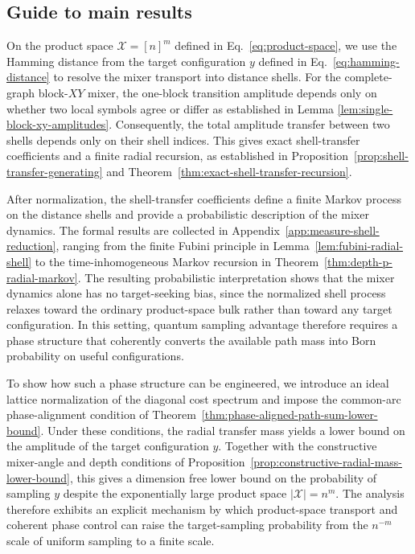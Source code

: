 \documentclass[a4paper,onecolumn,11pt,unpublished]{quantumarticle}
\theoremstyle{remark}
\begin{document}
\subsection{Guide to main results}
On the product space \(\mathcal X=[n]^m\) defined in Eq.~\eqref{eq:product-space}, we use the Hamming distance from the target configuration \(y\) defined in Eq.~\eqref{eq:hamming-distance} to resolve the
mixer transport into distance shells. For the complete-graph block-\(XY\)
mixer, the one-block transition amplitude depends only on whether two local
symbols agree or differ as established in Lemma \ref{lem:single-block-xy-amplitudes}. Consequently, the total amplitude transfer
between two shells depends only on their shell indices. This gives exact
shell-transfer coefficients and a finite radial recursion, as established in
Proposition~\ref{prop:shell-transfer-generating} and
Theorem~\ref{thm:exact-shell-transfer-recursion}.


After normalization, the shell-transfer coefficients define a finite Markov process on the distance shells and provide a probabilistic description of the mixer dynamics. The formal results are collected in Appendix~\ref{app:measure-shell-reduction}, ranging from the finite Fubini principle in Lemma~\ref{lem:fubini-radial-shell} to the time-inhomogeneous Markov recursion in Theorem~\ref{thm:depth-p-radial-markov}. The resulting probabilistic interpretation shows that the mixer dynamics alone has no target-seeking bias, since the normalized shell process relaxes toward the ordinary product-space bulk rather than toward any target configuration. In this setting, quantum sampling advantage therefore requires a phase structure that coherently converts the available path mass into Born probability on useful configurations. 

To show how such a phase structure can be engineered, we introduce an ideal lattice normalization of the diagonal cost spectrum and impose the common-arc phase-alignment condition of Theorem~\ref{thm:phase-aligned-path-sum-lower-bound}. Under these conditions, the radial transfer mass yields a lower bound on the amplitude of the target configuration \(y\). Together with the constructive mixer-angle and depth conditions of Proposition~\ref{prop:constructive-radial-mass-lower-bound}, this gives a dimension free lower bound on the probability of sampling \(y\) despite the exponentially large product space \(|\mathcal X|=n^m\). The analysis therefore exhibits an explicit mechanism by which product-space transport and coherent phase control can raise the target-sampling probability from the \(n^{-m}\) scale of uniform sampling to a finite scale.
\end{document}

